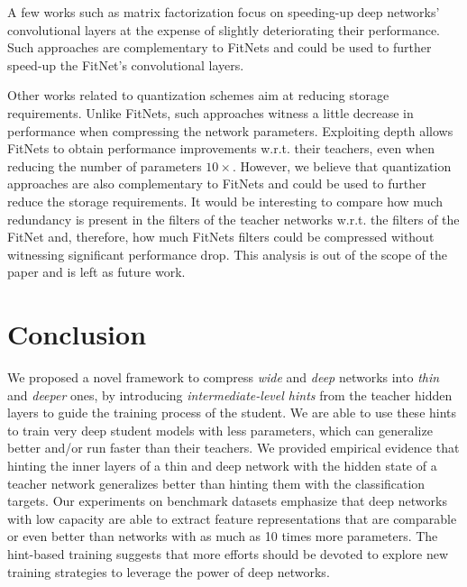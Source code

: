 \documentclass{article} %
\begin{document}
A few works such as matrix factorization \citep{Jaderberg14,Denton14} focus on speeding-up deep networks' convolutional layers at the expense of slightly deteriorating their performance. Such approaches are complementary to FitNets and could be used to further speed-up the FitNet's convolutional layers.

Other works related to quantization schemes \citep{Chen10,Jegou11,Gong14} aim at reducing storage requirements. Unlike FitNets, such approaches witness a little decrease in performance when compressing the network parameters. Exploiting depth allows FitNets to obtain performance improvements w.r.t. their teachers, even when reducing the number of parameters $10\times$. However, we believe that quantization approaches are also complementary to FitNets and could be used to further reduce the storage requirements. It would be interesting to compare how much redundancy is present in the filters of the teacher networks w.r.t. the filters of the FitNet and, therefore, how much FitNets filters could be compressed without witnessing significant performance drop. This analysis is out of the scope of the paper and is left as future work.

\vspace*{-1mm}
\section{Conclusion}
\label{sec:concl}
\vspace*{-1mm}

We proposed a novel framework to compress \emph{wide} and \emph{deep}
networks into \emph{thin} and \emph{deeper} ones, by introducing
\emph{intermediate-level hints} from the teacher hidden layers to guide the
training process of the student. We are able to use these hints to train
very deep student models with less parameters, which can generalize better
and/or run faster than their teachers. We provided empirical evidence that hinting the inner layers of a thin and deep network with the hidden state of a teacher network generalizes better than hinting them with the classification targets. Our experiments on benchmark datasets emphasize that deep networks with low capacity are able to extract
feature representations that are comparable or even better than networks
with as much as 10 times more parameters. The hint-based training suggests
that more efforts should be devoted to explore new training strategies to
leverage the power of deep networks.


\vspace*{-1mm}
\end{document}
